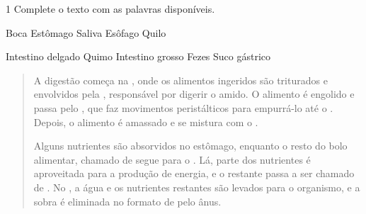 
\pagebreak
{}

\num{1} Complete o texto com as palavras disponíveis.

\begin{mdframed}[linewidth=2pt,linecolor=salmao,backgroundcolor=salmao!20]
Boca \hfill Estômago \hfill Saliva \hfill Esôfago \hfill Quilo \hfill

\noindent{}Intestino delgado \hfill Quimo \hfill Intestino grosso \hfill Fezes \hfill Suco gástrico \hfill
\end{mdframed}

\begin{quote}
A digestão começa na , onde os alimentos ingeridos são triturados e envolvidos pela , responsável por digerir o amido. O alimento é engolido e passa pelo , que faz movimentos peristálticos para empurrá-lo até o . Depois, o alimento é amassado e se mistura com o .

Alguns nutrientes são absorvidos no estômago, enquanto o resto do bolo alimentar, chamado de  segue para o . Lá, parte dos nutrientes é aproveitada para a produção de energia, e o restante passa a ser chamado de . No , a água e os nutrientes restantes são levados para o organismo, e a sobra é eliminada no formato de  pelo ânus.
\end{quote}

